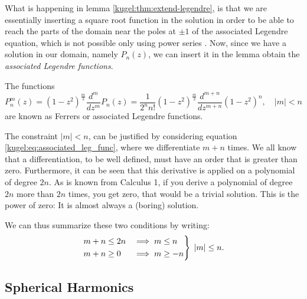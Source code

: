 What is happening in lemma \ref{kugel:thm:extend-legendre}, is that we are
essentially inserting a square root function in the solution in order to be able
to reach the parts of the domain near the poles at $\pm 1$ of the associated
Legendre equation, which is not possible only using power series
. Now, since
we have a solution in our domain, namely $P_n(z)$, we can insert it in the lemma 
obtain the \emph{associated Legendre functions}.

\begin{definition}
  \label{kugel:def:ferrers-functions}
  The functions
  \begin{equation}
    P^m_n (z) = (1-z^2)^{\frac{m}{2}}\frac{d^{m}}{dz^{m}} P_n(z)
      = \frac{1}{2^n n!}(1-z^2)^{\frac{m}{2}}
        \frac{d^{m+n}}{dz^{m+n}}(1-z^2)^n, \quad |m|<n
  \end{equation}
  are known as Ferrers or associated Legendre functions.
\end{definition}
The constraint $|m|<n$, can be justified by considering equation
\eqref{kugel:eq:associated_leg_func}, where we differentiate $m+n$ times. We all
know that a differentiation, to be well defined, must have an order that is
greater than zero. Furthermore, it can be seen that this derivative is applied
on a polynomial of degree $2n$. As is known from Calculus 1, if you derive a
polynomial of degree $2n$ more than $2n$ times, you get zero, that would be a
trivial solution. This is the power of zero: It is almost always a (boring)
solution.

We can thus summarize these two conditions by writing:
\begin{equation*}
    \begin{rcases}
        m+n \leq 2n &\implies m \leq n \\
        m+n \geq 0  &\implies  m \geq -n
    \end{rcases} \; |m| \leq n.
\end{equation*}

\subsection{Spherical Harmonics}

